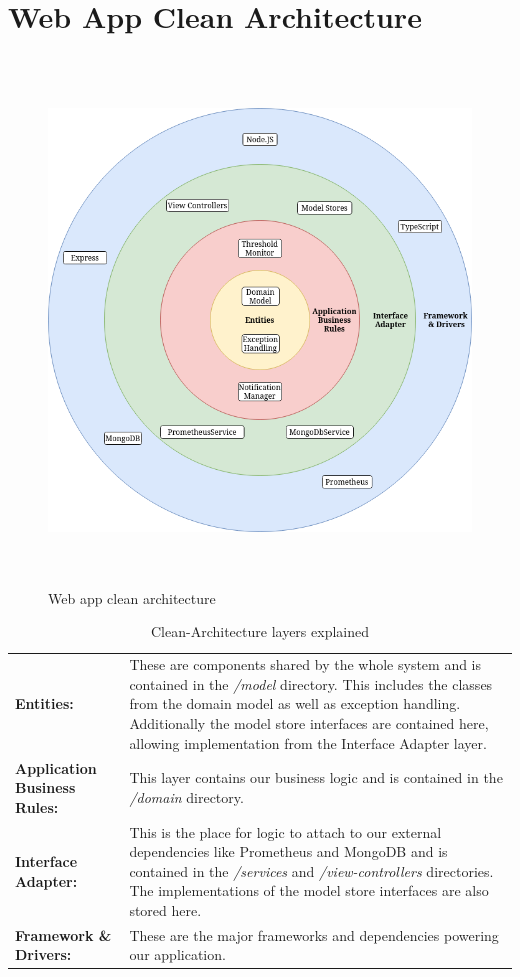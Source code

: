 \section{Web App Clean Architecture}
\begin{figure}[H]
  \centering
  \includegraphics[height=14cm]{resources/clean_architecture.drawio.png}
  \caption{Web app clean architecture}
  \label{fig:web-app-architecture}
\end{figure}

\begin{table}[H]
  \begin{tabular*}{\textwidth}{p{3cm} | p{11cm}}
    \textbf{Entities:}
      & These are components shared by the whole system and is contained in the \textit{/model} directory. This includes the classes from the domain model as well as exception handling. Additionally the model store interfaces are contained here, allowing implementation from the Interface Adapter layer. \bigskip \\
    \textbf{Application Business Rules:}
      & This layer contains our business logic and is contained in the \textit{/domain} directory. \bigskip \\
    \textbf{Interface Adapter:}
      & This is the place for logic to attach to our external dependencies like Prometheus and MongoDB and is contained in the \textit{/services} and \textit{/view-controllers} directories. The implementations of the model store interfaces are also stored here. \bigskip \\
    \textbf{Framework \& Drivers:}
      & These are the major frameworks and dependencies powering our application. \\
  \end{tabular*}
  \caption{Clean-Architecture layers explained}
  \label{tab:clean-architecture-layers-explained}
\end{table}

